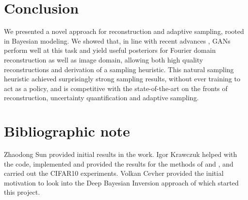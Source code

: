 \section{Conclusion}\label{sec:gans_conclusion}

We presented a novel approach for reconstruction and adaptive sampling, rooted in Bayesian modeling. We showed that, in line with recent advances \citep{belghazi2019learning,adler2018deep}, GANs perform well at this task and yield useful posteriors for Fourier domain reconstruction as well as image domain, allowing both high quality reconstructions and derivation of a sampling heuristic. This natural sampling heuristic achieved surprisingly strong sampling results, without ever training to act as a policy, and is competitive with the state-of-the-art on the fronts of reconstruction, uncertainty quantification and adaptive sampling.


\section*{Bibliographic note}
Zhaodong Sun provided initial results in the work. Igor Krawczuk helped with the code, implemented and provided the results for the methods of \citet{zhang2019reducing} and \citet{bakker2020experimental}, and carried out the CIFAR10 experiments. Volkan Cevher provided the initial motivation to look into the Deep Bayesian Inversion approach of \citet{adler2018deep} which started this project.
